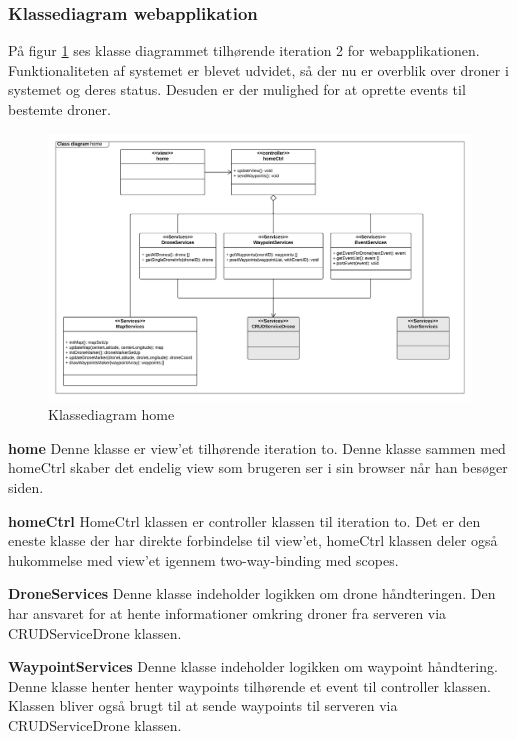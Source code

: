 \subsubsection*{Klassediagram webapplikation}
\vspace{-0.1cm}
På figur \ref{fig:classDiagram_home} ses klasse diagrammet tilhørende iteration 2 for webapplikationen. Funktionaliteten af systemet er blevet udvidet, så der nu er overblik over droner i systemet og deres status. Desuden er der mulighed for at oprette events til bestemte droner. 
\begin{figure}[H]
	\centering
	\includegraphics[width=1.\textwidth]{Billeder/klasse_diagrammer/home_class_diagram.png}
	\vspace{-0.5cm}
	\caption{Klassediagram home}
	\label{fig:classDiagram_home}
\end{figure}

\textbf{home}
Denne klasse er view'et tilhørende iteration to. Denne klasse sammen med homeCtrl skaber det endelig view som brugeren ser i sin browser når han besøger siden.

\textbf{homeCtrl}
HomeCtrl klassen er controller klassen til iteration to. Det er den eneste klasse der har direkte forbindelse til view'et, homeCtrl klassen deler også hukommelse med view'et igennem two-way-binding med scopes.

\textbf{DroneServices}
Denne klasse indeholder logikken om drone håndteringen. Den har ansvaret for at hente informationer omkring droner fra serveren via CRUDServiceDrone klassen.

\textbf{WaypointServices}
Denne klasse indeholder logikken om waypoint håndtering. Denne klasse henter henter waypoints tilhørende et event til controller klassen. Klassen bliver også brugt til at sende waypoints til serveren via CRUDServiceDrone klassen.

